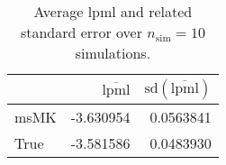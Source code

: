 \begin{table}[H]

\caption{Average lpml and related standard error over $n_{\text{sim}} = 10$ simulations.}
\centering
\begin{tabular}[t]{lrr}
\toprule
  & $\overbar{\text{lpml}}$ & $\text{sd}(\overbar{\text{lpml}})$\\
\midrule
msMK & -3.630954 & 0.0563841\\
True & -3.581586 & 0.0483930\\
\bottomrule
\end{tabular}
\end{table}